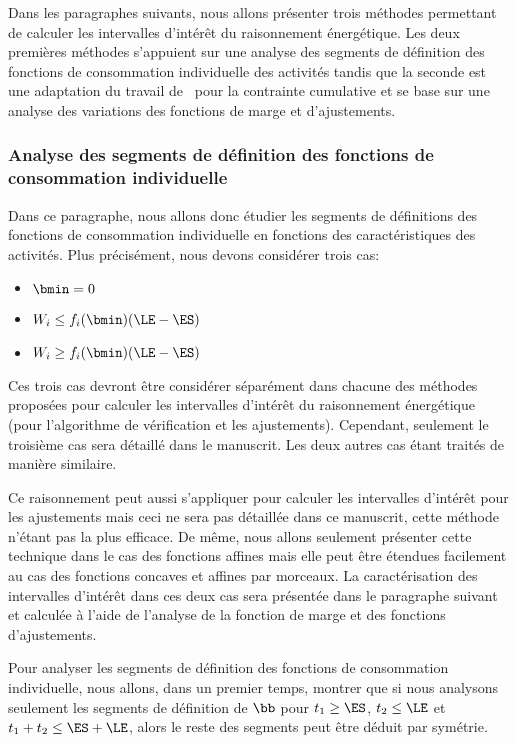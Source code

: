 Dans les paragraphes suivants, nous allons présenter trois méthodes
permettant de calculer les intervalles d'intérêt du raisonnement
énergétique. Les deux premières méthodes s'appuient sur une analyse
des segments de définition des fonctions de consommation individuelle
des activités tandis que la seconde est une adaptation du travail
de~\cite{Alb} pour la contrainte cumulative et se base sur une analyse
des variations des fonctions de marge et d'ajustements.

\subsubsection{Analyse des segments de définition des fonctions de 
  consommation individuelle}

Dans ce paragraphe, nous allons donc étudier les segments de
définitions des fonctions de consommation individuelle en fonctions
des caractéristiques des activités. Plus précisément, nous devons
considérer trois cas:
\begin{itemize}
\item $\bmin=0$
\item $W_i \le f_i(\bmin)(\LE-\ES)$
\item $W_i \ge f_i(\bmin)(\LE-\ES)$
\end{itemize}
Ces trois cas devront être considérer séparément dans chacune des
méthodes proposées pour calculer les intervalles d'intérêt du
raisonnement énergétique (pour l'algorithme de vérification et les
ajustements). Cependant, seulement le troisième cas sera détaillé dans
le manuscrit. Les deux autres cas étant traités de manière similaire. 

Ce raisonnement peut aussi s'appliquer pour calculer les intervalles
d'intérêt pour les ajustements mais ceci ne sera pas détaillée dans ce
manuscrit, cette méthode n'étant pas la plus efficace. De même, nous
allons seulement présenter cette technique dans le cas des fonctions
affines mais elle peut être étendues facilement au cas des fonctions
concaves et affines par morceaux. La caractérisation des intervalles
d'intérêt dans ces deux cas sera présentée dans le paragraphe suivant
et calculée à l'aide de l'analyse de la fonction de marge et des
fonctions d'ajustements. 

Pour analyser les segments de définition des fonctions de consommation
individuelle, nous allons, dans un premier temps, montrer que si nous
analysons seulement les segments de définition de $\bb$ pour $t_1 \ge
\ES$, $t_2 \le \LE$ et $t_1+t_2 \le \ES + \LE$, alors le reste des
segments peut être déduit par symétrie.

